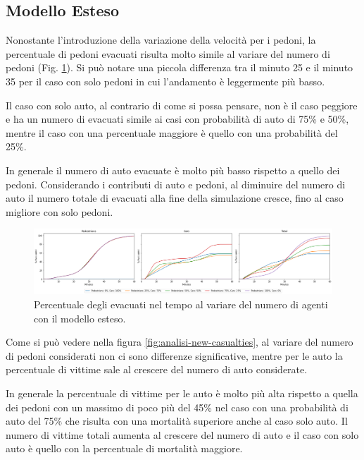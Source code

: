 \pagebreak

\subsection{Modello Esteso}
Nonostante l'introduzione della variazione della velocità per i pedoni,
la percentuale di pedoni evacuati risulta molto simile al variare del numero di pedoni (Fig. \ref{fig:analisi-new-evacuated}).
Si può notare una piccola differenza tra il minuto 25 e il minuto 35 per il caso con solo pedoni in cui l'andamento è leggermente più basso.

Il caso con solo auto, al contrario di come si possa pensare, non è il caso peggiore e ha un numero di evacuati simile ai casi
con probabilità di auto di 75\% e 50\%, mentre il caso con una percentuale maggiore è quello con una probabilità del 25\%.

In generale il numero di auto evacuate è molto più basso rispetto a quello dei pedoni.
%
Considerando i contributi di auto e pedoni, al diminuire del numero di auto il numero totale di evacuati alla fine della simulazione cresce,
fino al caso migliore con solo pedoni.

\begin{figure}[ht]
    \centering
    \includegraphics[width=\textwidth]{images/analisi/new-evacuated.png}
    \caption{Percentuale degli evacuati nel tempo al variare del numero di agenti con il modello esteso.}
    \label{fig:analisi-new-evacuated}
\end{figure}

Come si può vedere nella figura \ref{fig:analisi-new-casualties}, al variare del numero di pedoni considerati non ci sono differenze significative,
mentre per le auto la percentuale di vittime sale al crescere del numero di auto considerate.

In generale la percentuale di vittime per le auto è molto più alta rispetto a quella dei pedoni
con un massimo di poco più del 45\% nel caso con una probabilità di auto del 75\% che risulta con una mortalità superiore anche al caso solo auto.
%
Il numero di vittime totali aumenta al crescere del numero di auto e il caso con solo auto è quello con la percentuale di mortalità maggiore.

